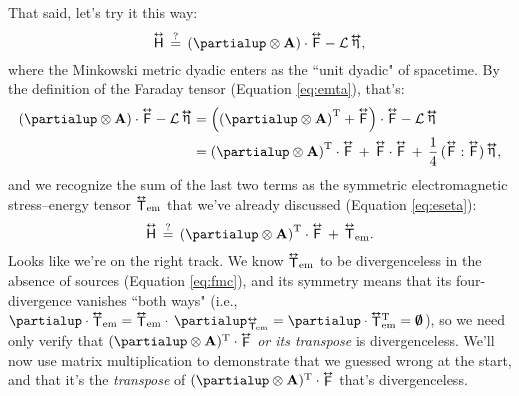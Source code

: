 \documentclass[12pt]{article}
\renewcommand{\vv}[1]{\mathbf{#1}}
\newcommand{\tightoverset}[2]{%
  \mathop{#2}\limits^{\vbox to -.5ex{\kern-0.75ex\hbox{$#1$}\vss}}}
\newcommand{\inlinedy}[1]{\tightoverset{\text{\tiny$\bm\leftrightarrow$}}{#1}}
\newcommand{\fnoverset}[2]{%
  \mathop{#2}\limits^{\vbox to -.5ex{\kern-0.85ex\hbox{$#1$}\vss}}}
\newcommand{\footnotedy}[1]{\fnoverset{\text{\tiny$\bm\leftrightarrow$}}{#1}}
\newcommand{\capdy}[1]{ \overset{ \text{\tiny$\bm\leftrightarrow$} }{\vphantom{\text{\small{A}}}\smash{#1}} }
\begin{document}
That said, let's try it this way:
\begin{equation*}
\capdy{\mathsf{H}} \, \stackrel{?}{=} \, \left( \partialup \otimes \vv A \right) \cdot \capdy{\mathsf{F}} - \mathcal{L} \inlinedy{\upeta} ,
\end{equation*}
where the Minkowski metric dyadic enters as the ``unit dyadic" of spacetime. By the definition of the Faraday tensor (Equation \ref{eq:emta}), that's:
\begin{equation*}
\begin{split}
\left( \partialup \otimes \vv A \right) \cdot \capdy{\mathsf{F}} - \mathcal{L} \inlinedy{\upeta} &=  \left( \left( \partialup \otimes \vv A \right)^\mathrm{T} + \capdy{\mathsf{F}} \right) \cdot \capdy{\mathsf{F}} - \mathcal{L} \inlinedy{\upeta} \\
&= \left( \partialup \otimes \vv A \right)^\mathrm{T} \cdot \capdy{\mathsf{F}} \, + \, \capdy{\mathsf{F}} \cdot \capdy{\mathsf{F}} \, + \, \dfrac{1}{4} \, ( \capdy{\mathsf{F}} : \capdy{\mathsf{F}} ) \inlinedy{\upeta},
\end{split}
\end{equation*}
and we recognize the sum of the last two terms as the symmetric electromagnetic stress--energy tensor ${\inlinedy{\mathsf{T}}}_{\textrm{em}}$ that we've already discussed (Equation \ref{eq:eseta}):
\begin{equation*}
\capdy{\mathsf{H}} \, \stackrel{?}{=} \, \left( \partialup \otimes \vv A \right)^\mathrm{T} \cdot \capdy{\mathsf{F}} \, + \, \capdy{\mathsf{T}}_{\textrm{em}} .
\end{equation*}
Looks like we're on the right track. We know ${\inlinedy{\mathsf{T}}}_{\textrm{em}}$ to be divergenceless in the absence of sources (Equation \ref{eq:fmc}), and its symmetry means that its four-divergence vanishes ``both ways" (i.e., ${\partialup \cdot {\inlinedy{\mathsf{T}}}_{\textrm{em}} = {\inlinedy{\mathsf{T}}}_{\textrm{em}} \cdot \, \partialup _{{\footnotedy{\mathsf{T}}}\mkern-3mu_{\textrm{em}}} = \partialup \cdot {\inlinedy{\mathsf{T}}} {}^{\mathrm{T}}_{\textrm{em}} = \textrm{\mbox{\boldmath $\emptyset$}}}$), so we need only verify that $( \partialup \otimes \vv A )^\mathrm{T} \cdot \inlinedy{\mathsf{F}}$ \emph{or its transpose} is divergenceless. We'll now use matrix multiplication to demonstrate that we guessed wrong at the start, and that it's the \emph{transpose} of $( \partialup \otimes \vv A )^\mathrm{T} \cdot \inlinedy{\mathsf{F}}$ that's divergenceless.
\end{document}
